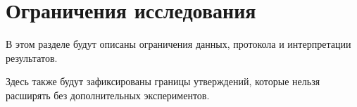 \section{Ограничения исследования}

В этом разделе будут описаны ограничения данных, протокола и интерпретации результатов.

Здесь также будут зафиксированы границы утверждений, которые нельзя расширять без дополнительных экспериментов.
